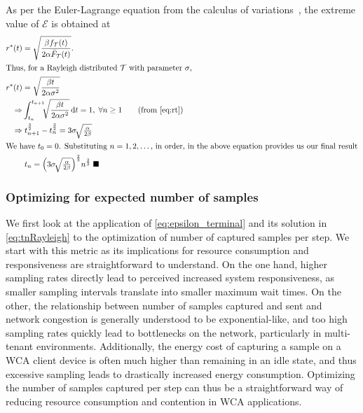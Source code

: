 As per the Euler-Lagrange equation from the calculus of variations~\cite{bellman1954dynamic,arfken2013calculus}, the extreme value of $\mathcal{E}$ is obtained at
\begin{alignat}{1}
r^*(t)&=\sqrt{\dfrac{\beta f_\mathcal{T}(t)}{2\alpha\bar{F}_\mathcal{T}(t)}}.\\
\intertext{Thus, for a Rayleigh distributed $\mathcal{T}$ with parameter $\sigma$,}
r^*(t)&=\sqrt{\dfrac{\beta t}{2\alpha\sigma^2}}\\
\Rightarrow &\int_{t_n}^{t_{n+1}}\!\!\!\sqrt{\dfrac{\beta t}{2\alpha\sigma^2}}\,\mathrm{d}t=1,\;\forall n\geq1\nonumber\tag{from \eqref{eq:rt}}\\
\Rightarrow &\;t_{n+1}^{\frac{3}{2}}-t_{n}^{\frac{3}{2}}=3\sigma\!\sqrt{\tfrac{\alpha}{2\beta}}\nonumber\\
\intertext{We have $t_0=0$. Substituting $n=1,2,\dots$, in order, in the above equation provides us our final result}
&\;t_n=\Big(3\sigma\!\sqrt{\tfrac{\alpha}{2\beta}}\Big)^{\frac{2}{3}}n^{\frac{2}{3}}\;\blacksquare\label{eq:tnRayleigh}
\end{alignat}


\subsubsection{Optimizing for expected number of samples}

We first look at the application of \cref{eq:epsilon_terminal} and its solution in \cref{eq:tnRayleigh} to the optimization of number of captured samples per step.
We start with this metric as its implications for resource consumption and responsiveness are straightforward to understand.
On the one hand, higher sampling rates directly lead to perceived increased system responsiveness, as smaller sampling intervals translate into smaller maximum wait times.
On the other, the relationship between number of samples captured and sent and network congestion is generally understood to be exponential-like, and too high sampling rates quickly lead to bottlenecks on the network, particularly in multi-tenant environments.
Additionally, the energy cost of capturing a sample on a \gls{WCA} client device is often much higher than remaining in an idle state, and thus excessive sampling leads to drastically increased energy consumption.
Optimizing the number of samples captured per step can thus be a straightforward way of reducing resource consumption and contention in \gls{WCA} applications.

